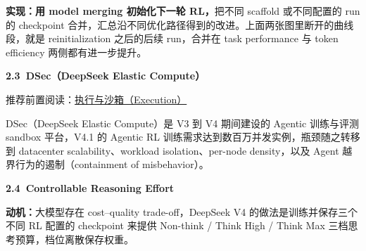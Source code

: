 \documentclass[zihao=false,fontset=windows]{ctexart}
\begin{document}
\textbf{实现：用 model merging 初始化下一轮 RL，}把不同 scaffold 或不同配置的 run 的 checkpoint 合并，汇总沿不同优化路径得到的改进。上面两张图里断开的曲线段，就是 reinitialization 之后的后续 run，合并在 task performance 与 token efficiency 两侧都有进一步提升。\par

\par{}\vspace{0.8em}\noindent \begin{tcolorbox}[boxrule=0pt,arc=3pt,colback=callOrange,left=3pt,right=3pt,top=2pt,bottom=2pt,before skip=0pt,after skip=0pt]{\bfseries \textcolor{feishuBlue}{2.3}\ DSec（DeepSeek Elastic Compute）}\end{tcolorbox}\par\vspace{0.28em}

\begin{feishuquote}

推荐前置阅读：\href{https://my.feishu.cn/wiki/RpoiwfvkCiR4dakQaP2cXAGWnMh?from=space_search}{执行与沙箱（Execution） }\par
\end{feishuquote}

DSec（DeepSeek Elastic Compute）是 V3 到 V4 期间建设的 Agentic 训练与评测 sandbox 平台，V4.1 的 Agentic RL 训练需求达到数百万并发实例，瓶颈随之转移到 datacenter scalability、workload isolation、per-node density，以及 Agent 越界行为的遏制（containment of misbehavior）。\par

\par{}\vspace{0.8em}\noindent \begin{tcolorbox}[boxrule=0pt,arc=3pt,colback=callOrange,left=3pt,right=3pt,top=2pt,bottom=2pt,before skip=0pt,after skip=0pt]{\bfseries \textcolor{feishuBlue}{2.4}\ Controllable Reasoning Effort}\end{tcolorbox}\par\vspace{0.28em}

\textbf{动机：}大模型存在 cost–quality trade-off，DeepSeek V4 的做法是训练并保存三个不同 RL 配置的 checkpoint 来提供 Non-think / Think High / Think Max 三档思考预算，档位离散保存权重。\par
\end{document}
